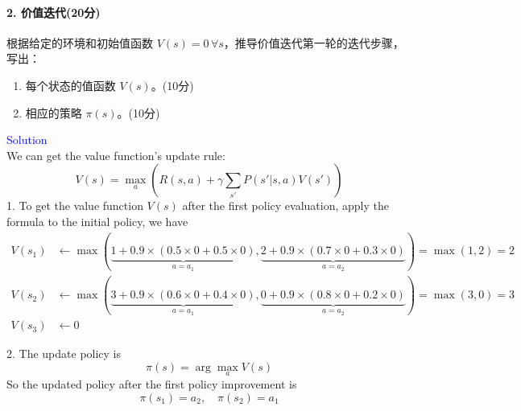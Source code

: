 \paragraph{2. 价值迭代(20分)}
根据给定的环境和初始值函数 \( V(s) = 0 \, \forall s \)，推导价值迭代第一轮的迭代步骤，写出：
\begin{enumerate}
    \item 每个状态的值函数 \( V(s) \)。(10分)
    \item 相应的策略 \( \pi(s) \)。(10分)
\end{enumerate}

\textcolor{blue}{Solution} \\

We can get the value function's update rule:
$$V(s) = \max_{a} \left(R(s, a) + \gamma\sum_{s'} P(s'|s, a)V(s')\right)$$
1. To get the value function $V(s)$ after the first policy evaluation, apply the formula to the initial policy, we have
\begin{align*}
V(s_1) &\gets \max\left(\underbrace{1 + 0.9 \times \left(0.5 \times 0 + 0.5 \times 0\right)}_{a=a_1}, \underbrace{2 + 0.9 \times \left(0.7 \times 0 + 0.3 \times 0\right)}_{a=a_2}\right) = \max(1,2) = 2 \\
V(s_2) &\gets \max\left(\underbrace{3 + 0.9 \times \left(0.6 \times 0 + 0.4 \times 0\right)}_{a=a_1}, \underbrace{0 + 0.9 \times \left(0.8 \times 0 + 0.2 \times 0\right)}_{a=a_2}\right) = \max(3,0) = 3 \\
V(s_3) &\gets 0
\end{align*}

2. The update policy is
$$\pi(s) = \arg\max_{a} V(s)$$
So the updated policy after the first policy improvement is
$$\pi(s_1) = a_2, \quad \pi(s_2) = a_1$$

\newpage
